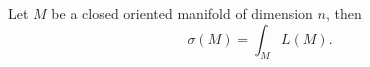 \documentclass[10pt]{article}
\begin{document}
\begin{theorem}
  Let $ M$ be a closed oriented manifold of dimension $ n$, then
  \begin{equation*}
    \sigma(M) = \int _{M} L(M).
  \end{equation*}
\end{theorem}

\label{LastPage}
\end{document}
